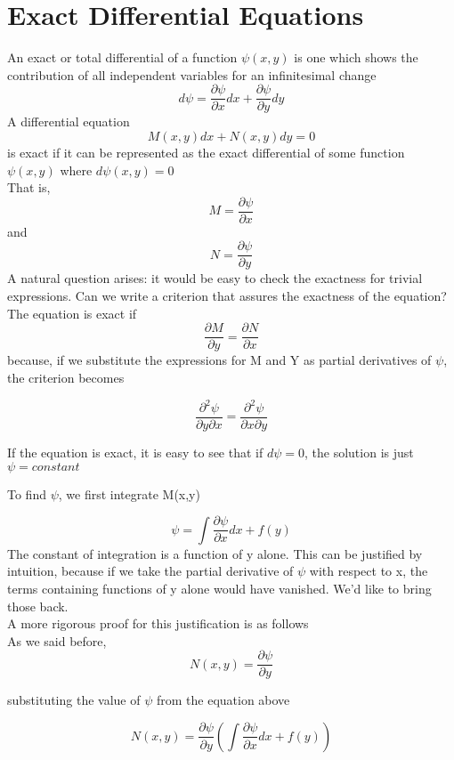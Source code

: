 \documentclass{article}
\begin{document}
	\section*{Exact Differential Equations}
	An exact or total differential of a function $\psi(x,y)$ is one which shows the contribution of all independent variables for an infinitesimal change
	\begin{equation}
	d\psi = \frac{\partial\psi}{\partial x}dx + \frac{\partial\psi}{\partial y}dy
	\end{equation}
	A differential equation
	$$M(x,y)dx + N(x,y)dy = 0$$ is exact if it can be represented as the exact differential of some function $\psi (x,y)$ where $d\psi (x,y) = 0$
	\\
	That is,
	$$M = \frac{\partial\psi}{\partial x} $$ and $$N = \frac{\partial\psi}{\partial y} $$
	A natural question arises: it would be easy to check the exactness for trivial expressions. Can we write a criterion that assures the exactness of the equation?\\
	
	The equation is exact if
	$$ \frac{\partial M}{\partial y} = \frac{\partial N}{\partial x}$$
	because, if we substitute the expressions for M and Y as partial derivatives of $\psi$, the criterion becomes
	
	$$\frac{\partial^2\psi}{\partial y \partial x} = \frac{\partial^2\psi}{\partial x \partial y}$$
	
	If the equation is exact, it is easy to see that if $d\psi=0$, the solution is just $\psi = constant$
	
	To find $\psi$, we first integrate M(x,y)
	
	$$\psi = \int \frac{\partial \psi}{\partial x}dx + f(y)$$
	The constant of integration is a function of y alone. This can be justified by intuition, because if we take the partial derivative of $\psi$ with respect to x, the terms containing functions of y alone would have vanished. We'd like to bring those back.
	\\
	
	A more rigorous proof for this justification is as follows\\
	
	As we said before,
	$$ N(x,y) = \frac{\partial\psi}{\partial y}$$
	
	substituting the value of $\psi$ from the equation above
	 
	$$ N(x,y) = \frac{\partial\psi}{\partial y} \left(\int \frac{\partial \psi}{\partial x}dx + f(y)\right) $$
	
\end{document}
